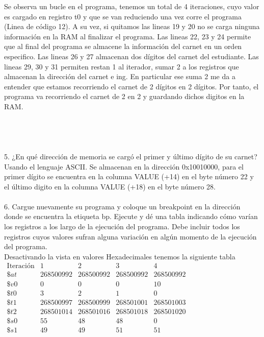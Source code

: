 \documentclass[a4paper,12pt]{article}
\begin{document}
Se observa un bucle en el programa, tenemos un total de 4 iteraciones, cuyo valor es cargado en registro t0 y que se van reduciendo una vez corre el programa (Linea de código 12). A su vez, si quitamos las lineas 19 y 20 no se carga ninguna información en la RAM al finalizar el programa. Las lineas 22, 23 y 24 permite que al final del programa se almacene la información del carnet en un orden especifico. Las lineas 26 y 27 almacenan dos dígitos del carnet del estudiante. Las lineas 29, 30 y 31 permiten restan 1 al iterador, sumar 2 a los registros que almacenan la dirección del carnet e ing. En particular ese suma 2 me da a entender que estamos recorriendo el carnet de 2 dígitos en 2 dígitos. Por tanto, el programa va recorriendo el carnet de 2 en 2 y guardando dichos digitos en la RAM. \\ \\ \\ \\ \\

5. ¿En qué dirección de memoria se cargó el primer y último dígito de su carnet? \\

Usando el lenguaje ASCII. Se almacenan en la dirección 0x10010000, para el primer dígito se encuentra en la columna VALUE (+14) en el byte número 22 y el último digito en la columna VALUE (+18) en el byte número 28. \\ \\

6. Cargue nuevamente su programa y coloque un breakpoint en la dirección donde se encuentra la etiqueta bp. Ejecute y dé una tabla indicando cómo varían los registros a los largo de la ejecución del programa. Debe incluir todos los registros cuyos valores sufran alguna variación en algún momento de la ejecución del programa. \\

Desactivando la vista en valores Hexadecimales tenemos la siguiente tabla\\

$ \begin{matrix}
   \text{Iteración} & 1 & 2 & 3 & 4 \\
  \$at & 268500992 & 268500992 & 268500992 & 268500992 \\
  \$v0 & 0 & 0 & 0 & 10 \\
  \$t0 & 3 & 2 & 1 & 0 \\ 
  \$t1 & 268500997 & 268500999 & 268501001 & 268501003 \\
  \$t2 & 268501014 & 268501016 & 268501018 & 268501020 \\
  \$s0 & 55 & 48 & 48 & 0  \\
  \$s1 & 49 & 49 & 51 & 51 \\
\end{matrix}  $
\end{document}
